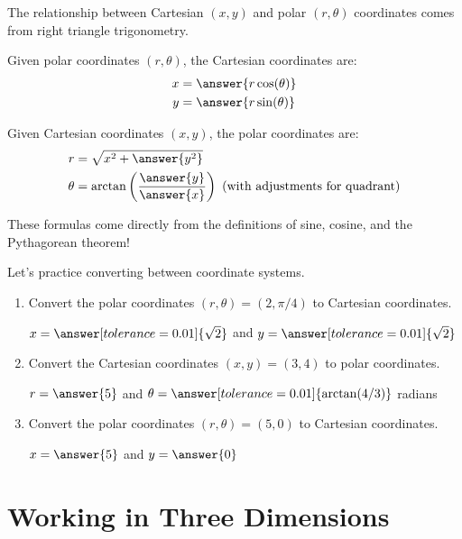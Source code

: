 \documentclass{ximera}
\begin{document}
\begin{problem}
    The relationship between Cartesian $(x,y)$ and polar $(r,\theta)$ coordinates comes from right triangle trigonometry.
    
    Given polar coordinates $(r,\theta)$, the Cartesian coordinates are:
    \begin{align*}
        x &= \answer{r\cos(\theta)} \\
        y &= \answer{r\sin(\theta)}
    \end{align*}
    
    Given Cartesian coordinates $(x,y)$, the polar coordinates are:
    \begin{align*}
        r &= \sqrt{x^2 + \answer{y^2}} \\
        \theta &= \arctan\left(\frac{\answer{y}}{\answer{x}}\right) \text{ (with adjustments for quadrant)}
    \end{align*}
    
    \begin{feedback}
        These formulas come directly from the definitions of sine, cosine, and the Pythagorean theorem!
    \end{feedback}
\end{problem}

\begin{problem}
    Let's practice converting between coordinate systems.
    
    \begin{enumerate}
        \item Convert the polar coordinates $(r,\theta) = (2, \pi/4)$ to Cartesian coordinates.
        
        $x = \answer[tolerance=0.01]{\sqrt{2}}$ and $y = \answer[tolerance=0.01]{\sqrt{2}}$
        
        \item Convert the Cartesian coordinates $(x,y) = (3,4)$ to polar coordinates.
        
        $r = \answer{5}$ and $\theta = \answer[tolerance=0.01]{\arctan(4/3)}$ radians
        
        \item Convert the polar coordinates $(r,\theta) = (5, 0)$ to Cartesian coordinates.
        
        $x = \answer{5}$ and $y = \answer{0}$
    \end{enumerate}
\end{problem}

\section*{Working in Three Dimensions}
\end{document}
